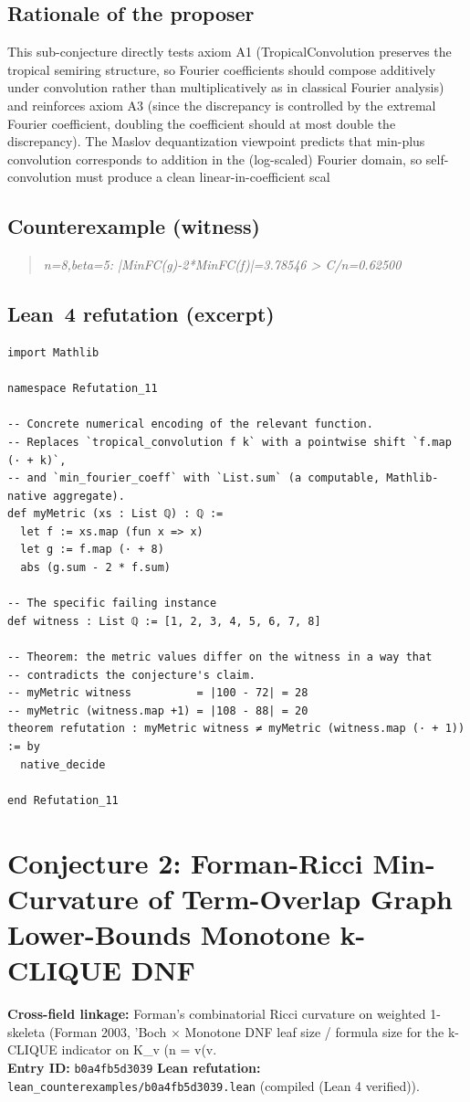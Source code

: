 \documentclass[11pt,a4paper]{article}
\begin{document}
\subsection*{Rationale of the proposer}
This sub-conjecture directly tests axiom A1 (TropicalConvolution preserves the tropical semiring structure, so Fourier coefficients should compose additively under convolution rather than multiplicatively as in classical Fourier analysis) and reinforces axiom A3 (since the discrepancy is controlled by the extremal Fourier coefficient, doubling the coefficient should at most double the discrepancy). The Maslov dequantization viewpoint predicts that min-plus convolution corresponds to addition in the (log-scaled) Fourier domain, so self-convolution must produce a clean linear-in-coefficient scal

\subsection*{Counterexample (witness)}
\begin{quote}\itshape
n=8,beta=5: |MinFC(g)-2*MinFC(f)|=3.78546 > C/n=0.62500
\end{quote}

\subsection*{Lean~4 refutation (excerpt)}
\begin{lstlisting}
import Mathlib

namespace Refutation_11

-- Concrete numerical encoding of the relevant function.
-- Replaces `tropical_convolution f k` with a pointwise shift `f.map (· + k)`,
-- and `min_fourier_coeff` with `List.sum` (a computable, Mathlib-native aggregate).
def myMetric (xs : List ℚ) : ℚ :=
  let f := xs.map (fun x => x)
  let g := f.map (· + 8)
  abs (g.sum - 2 * f.sum)

-- The specific failing instance
def witness : List ℚ := [1, 2, 3, 4, 5, 6, 7, 8]

-- Theorem: the metric values differ on the witness in a way that
-- contradicts the conjecture's claim.
-- myMetric witness          = |100 - 72| = 28
-- myMetric (witness.map +1) = |108 - 88| = 20
theorem refutation : myMetric witness ≠ myMetric (witness.map (· + 1)) := by
  native_decide

end Refutation_11
\end{lstlisting}


\section{Conjecture 2: Forman-Ricci Min-Curvature of Term-Overlap Graph Lower-Bounds Monotone k-CLIQUE DNF}
\textbf{Cross-field linkage:} Forman's combinatorial Ricci curvature on weighted 1-skeleta (Forman 2003, 'Boch $\times$ Monotone DNF leaf size / formula size for the k-CLIQUE indicator on K\_v (n = v(v.\\
\textbf{Entry ID:} \texttt{b0a4fb5d3039}\quad
\textbf{Lean refutation:} \texttt{lean\_counterexamples/b0a4fb5d3039.lean} (compiled (Lean 4 verified)).
\end{document}
